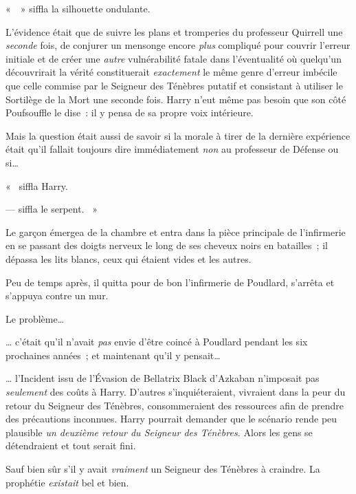 «~~» siffla la silhouette ondulante.

L'évidence était que de suivre les plans et tromperies du professeur Quirrell une \emph{seconde} fois, de conjurer un mensonge encore \emph{plus} compliqué pour couvrir l'erreur initiale et de créer une \emph{autre} vulnérabilité fatale dans l'éventualité où quelqu'un découvrirait la vérité constituerait \emph{exactement} le même genre d'erreur imbécile que celle commise par le Seigneur des Ténèbres putatif et consistant à utiliser le Sortilège de la Mort une seconde fois.
Harry n'eut même pas besoin que son côté Poufsouffle le dise~: il y pensa de sa propre voix intérieure.

Mais la question était aussi de savoir si la morale à tirer de la dernière expérience était qu'il fallait toujours dire immédiatement \emph{non} au professeur de Défense ou si…

«~ siffla Harry.

---  siffla le serpent.
~»

\later

Le garçon émergea de la chambre et entra dans la pièce principale de l'infirmerie en se passant des doigts nerveux le long de ses cheveux noirs en batailles~; il dépassa les lits blancs, ceux qui étaient vides et les autres.

Peu de temps après, il quitta pour de bon l'infirmerie de Poudlard, s'arrêta et s'appuya contre un mur.

Le problème…

… c'était qu'il n'avait \emph{pas} envie d'être coincé à Poudlard pendant les six prochaines années~; et maintenant qu'il y pensait…

… l'Incident issu de l'Évasion de Bellatrix Black d'Azkaban n'imposait pas \emph{seulement} des coûts à Harry.
D'autres s'inquiéteraient, vivraient dans la peur du retour du Seigneur des Ténèbres, consommeraient des ressources afin de prendre des précautions inconnues.
Harry pourrait demander que le scénario rende peu plausible \emph{un deuxième retour du Seigneur des Ténèbres.} Alors les gens se détendraient et tout serait fini.

Sauf bien sûr s'il y avait \emph{vraiment} un Seigneur des Ténèbres à craindre.
La prophétie \emph{existait} bel et bien.

